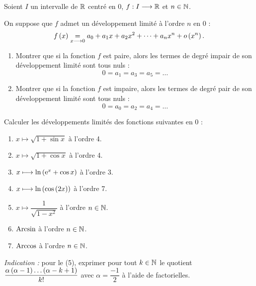 \begin{exo}
Soient \(I\) un intervalle de \(\mathbb{R}\) centré en \(0\), \(f:I\longrightarrow\mathbb{R}\) et \(n\in\mathbb{N}\).

On suppose que \(f\) admet un développement limité à l'ordre \(n\) en \(0\) : \[f\left(x\right)\underset{x\longrightarrow0}{=}a_0+a_1x+a_2x^2+\dots+a_nx^n+o\left(x^n\right).\]

\begin{enumerate}
\item Montrer que si la fonction \(f\) est paire, alors les termes de degré impair de son développement limité sont tous nuls : \[0=a_1=a_3=a_5=\dots\]

\item Montrer que si la fonction \(f\) est impaire, alors les termes de degré pair de son développement limité sont tous nuls : \[0=a_0=a_2=a_4=\dots\]
\end{enumerate}
\end{exo}

\begin{corr}
\end{corr}

\begin{exo}
Calculer les développements limités des fonctions suivantes en \(0\) :

\begin{enumerate}
\item \(x\mapsto\sqrt{1+\sin x}\) à l'ordre 4. \\

\item \(x\mapsto\sqrt{1+\cos x}\) à l'ordre 4. \\

\item \(x\longmapsto\ln\left(\mathrm{e}^{x}+\cos x\right)\) à l'ordre 3. \\

\item \(x\longmapsto\ln\left(\cos\left(2x\right)\right)\) à l'ordre 7. \\

\item \(x\mapsto\dfrac{1}{\sqrt{1-x^2}}\) à l'ordre \(n\in\mathbb{N}\). \\

\item \(\operatorname{Arcsin}\) à l'ordre \(n\in\mathbb{N}\). \\

\item \(\operatorname{Arccos}\) à l'ordre \(n\in\mathbb{N}\).
\end{enumerate}

\textit{Indication :} pour le (5), exprimer pour tout \(k\in\mathbb{N}\) le quotient \(\dfrac{\alpha\left(\alpha-1\right)\dots\left(\alpha-k+1\right)}{k!}\) avec \(\alpha=\dfrac{-1}{2}\) à l'aide de factorielles.
\end{exo}

